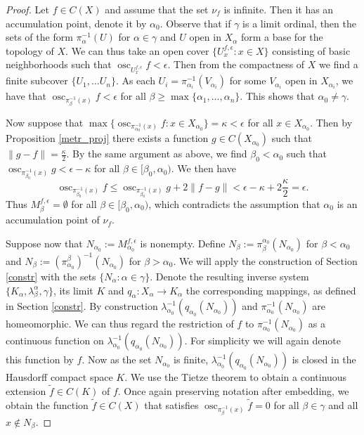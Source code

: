 \documentclass[11pt]{article}
\DeclareMathOperator{\osc}{osc}
\theoremstyle{definition}
\theoremstyle{remark}
\begin{document}
\begin{proof}
	Let $f \in C(X)$ and assume that the set $\nu_f$ is infinite. Then it has an accumulation point, denote it by $\alpha_0$. Observe that if $\gamma$ is a limit ordinal, then the sets of the form $\pi_\alpha^{-1}(U)$ for $\alpha \in \gamma$ and $U$ open in $X_\alpha$ form a base for the topology of $X$. We can thus take an open cover $\{U^{f,\epsilon}_x: x \in X\}$ consisting of basic neighborhoods such that $\osc_{U^{f,\epsilon}_x} f < \epsilon$. Then from the compactness of $X$ we find a finite subcover $\{U_1, \dots U_n\}$. As each $U_i = \pi_{\alpha_i}^{-1}(V_{\alpha_i})$ for some $V_{\alpha_i}$ open in $X_{\alpha_i}$, we have that $\osc_{\pi_\beta^{-1}(x)} f < \epsilon$ for all $\beta \geq \max \{\alpha_1, \dots, \alpha_n\}$. This shows that $\alpha_0 \neq \gamma$.
	
	Now suppose that $\max\{\osc_{\pi_{\alpha_0}^{-1}(x)} f: x \in X_{\alpha_0}\} = \kappa < \epsilon$ for all $x \in X_{\alpha_0}$. Then by Proposition \ref{metr_proj} there exists a function $g \in C(X_{\alpha_0})$ such that $\|g -f\| = \frac{\kappa}{2}$. By the same argument as above, we find $\beta_0 < \alpha_0$ such that $\osc_{\pi_{\beta_0}^{-1}(x)} g < \epsilon - \kappa$ for all $\beta \in [\beta_0, \alpha_0)$. We then have
	\begin{equation*}
		\osc_{\pi_{\beta_0}^{-1}(x)} f  \leq \osc_{\pi_{\beta_0}^{-1}(x)} g + 2\|f-g\|< \epsilon - \kappa + 2 \frac{\kappa}{2} = \epsilon.
	\end{equation*}
	Thus $M^{f, \epsilon}_\beta = \emptyset$ for all $\beta \in [\beta_0, \alpha_0)$, which contradicts the assumption that $\alpha_0$ is an accumulation point of $\nu_f$.
	
	Suppose now that $N_{\alpha_0} := M^{f, \epsilon}_{\alpha_0}$ is nonempty. Define $N_\beta := \pi^{\alpha_0}_\beta (N_{\alpha_0})$ for $\beta < \alpha_0$ and $N_\beta := (\pi^\beta_{\alpha_0})^{-1} (N_{\alpha_0})$ for $\beta > \alpha_0$. We will apply the construction of Section \ref{constr} with the sets $\{N_\alpha: \alpha \in \gamma\}$. Denote the resulting inverse system $\{K_\alpha, \lambda^\alpha_\beta, \gamma\}$, its limit $K$ and $q_\alpha: X_\alpha \to K_\alpha$ the corresponding mappings, as defined in Section \ref{constr}. By construction $\lambda_{\alpha_0}^{-1}(q_{\alpha_0}(N_{\alpha_0}))$ and $\pi_{\alpha_0}^{-1}(N_{\alpha_0})$ are homeomorphic. We can thus regard the restriction of $f$ to $\pi_{\alpha_0}^{-1}(N_{\alpha_0})$ as a continuous function on $\lambda_{\alpha_0}^{-1}(q_{\alpha_0}(N_{\alpha_0}))$. For simplicity we will again denote this function by $f$. Now as the set $N_{\alpha_0}$ is finite, $\lambda_{\alpha_0}^{-1}(q_{\alpha_0}(N_{\alpha_0}))$ is closed in the Hausdorff compact space $K$. We use the Tietze  theorem to obtain a continuous extension $\tilde{f} \in C(K)$ of $f$. Once again preserving notation after embedding, we obtain the function $\tilde{f} \in C(X)$ that satisfies $\osc_{\pi_\beta^{-1}(x)} \tilde{f} = 0$ for all $\beta \in \gamma$ and all $x \notin N_\beta$.
	

\end{proof}
\end{document}
